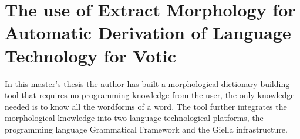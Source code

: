 \documentclass[12pt,a4paper]{article}
\begin{document}
\newpage
\section{The use of Extract Morphology for Automatic Derivation of Language Technology for Votic}


In this master's thesis the author has built a morphological dictionary building tool that requires no programming knowledge from the user, the only knowledge needed is to know all the wordforms of a word. The tool further integrates the morphological knowledge into two language technological platforms, the programming language Grammatical Framework and the Giella infrastructure. 






%
%
%
\end{document}
